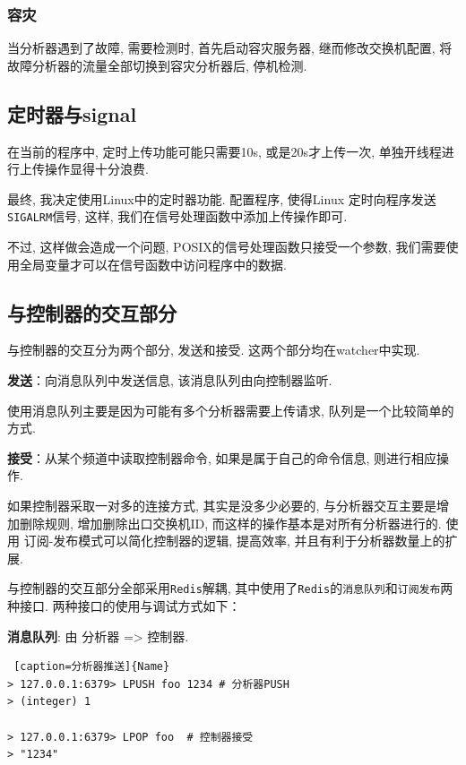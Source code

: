 \subsubsection{容灾}

当分析器遇到了故障, 需要检测时, 首先启动容灾服务器, 继而修改交换机配置,
将故障分析器的流量全部切换到容灾分析器后, 停机检测.

\subsection{定时器与signal}

在当前的程序中, 定时上传功能可能只需要10s, 或是20s才上传一次,
单独开线程进行上传操作显得十分浪费.

最终, 我决定使用Linux中的定时器功能. 配置程序, 使得Linux
定时向程序发送\texttt{SIGALRM}信号,
这样, 我们在信号处理函数中添加上传操作即可.

不过, 这样做会造成一个问题, POSIX的信号处理函数只接受一个参数,
我们需要使用全局变量才可以在信号函数中访问程序中的数据.

\subsection{与控制器的交互部分}

与控制器的交互分为两个部分, 发送和接受. 这两个部分均在watcher中实现.

\textbf{发送}：向消息队列中发送信息, 该消息队列由向控制器监听.

使用消息队列主要是因为可能有多个分析器需要上传请求, 队列是一个比较简单的方式.

\textbf{接受}：从某个频道中读取控制器命令, 如果是属于自己的命令信息, 则进行相应操作.

如果控制器采取一对多的连接方式, 其实是没多少必要的, 与分析器交互主要是增加删除规则,
增加删除出口交换机ID, 而这样的操作基本是对所有分析器进行的. 使用
订阅-发布模式可以简化控制器的逻辑, 提高效率, 并且有利于分析器数量上的扩展.

与控制器的交互部分全部采用\texttt{Redis}解耦,
其中使用了\texttt{Redis}的\texttt{消息队列}和\texttt{订阅发布}两种接口.
两种接口的使用与调试方式如下：

\textbf{消息队列}: 由 分析器 =\textgreater{} 控制器.

\begin{lstlisting} [caption=分析器推送]{Name}
> 127.0.0.1:6379> LPUSH foo 1234 # 分析器PUSH
> (integer) 1

> 127.0.0.1:6379> LPOP foo  # 控制器接受
> "1234"
\end{lstlisting}


